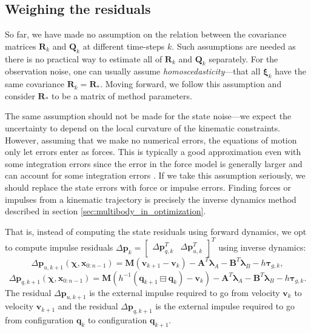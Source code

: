 \documentclass[preprint,12pt]{elsarticle}
\let\vec\bm
\let\mat\mathbf
\def\param{\vec{\chi}}
\let\amssymbboxminus\boxminus
\renewcommand{\boxminus}{\mathbin{\mathop\amssymbboxminus}}
\numberwithin{equation}{section}
\def\conf{q}
\def\obsnoise{\xi}
\begin{document}
\subsection{Weighing the residuals}
So far, we have made no assumption on the relation between the covariance matrices $\mat{R}_k$ and $\mat{Q}_k$ at different time-steps $k$.
Such assumptions are needed as there is no practical way to estimate all of $\mat{R}_k$ and $\mat{Q}_k$ separately.
For the observation noise, one can usually assume \emph{homoscedasticity}---that all $\vec{\obsnoise}_k$ have the same covariance $\mat{R}_k = \mat{R}_*$.
Moving forward, we follow this assumption and consider $\mat{R}_*$ to be a matrix of method parameters.

The same assumption should not be made for the state noise---we expect the uncertainty to depend on the local curvature of the kinematic constraints.
However, assuming that we make no numerical errors, the equations of motion only let errors enter as forces.
This is typically a good approximation even with some integration errors since the error in the force model is generally larger and can account for some integration errors \cite{sanjurjoAccuracyEfficiencyComparison2017}.
If we take this assumption seriously, we should replace the state errors with force or impulse errors.
Finding forces or impulses from a kinematic trajectory is precisely the inverse dynamics method described in section \ref{sec:multibody_in_optimization}.

That is, instead of computing the state residuals using forward dynamics, we opt to compute impulse residuals $\Delta \vec{p}_{k} = \begin{bmatrix}
    \Delta \vec{p}_{q,k}^T & \Delta \vec{p}_{u,k}^T
\end{bmatrix}^T$
using inverse dynamics:
\begin{equation}
    \Delta \vec{p}_{u, k+1}(\param, \vec{x}_{0:n-1}) = \mat{M} (\vec{v}_{k+1} - \vec{v}_k) - \mat{A}^T \vec{\lambda}_A - \mat{B}^T \vec{\lambda}_B - h \vec{\tau}_{g,k},
\end{equation}
\begin{equation}
    \Delta \vec{p}_{q, k+1}(\param, \vec{x}_{0:n-1}) = 
    \mat{M} (h^{-1}
    (\vec{\conf}_{k+1} \boxminus \vec{\conf}_{k}) 
    - \vec{v}_k) 
    - \mat{A}^T \vec{\lambda}_A -\mat{B}^T \vec{\lambda}_B - h \vec{\tau}_{g,k}.
\end{equation}
The residual $\Delta \vec{p}_{u, k+1}$ is the external impulse required to go from velocity $\vec{v}_k$ to velocity $\vec{v}_{k+1}$ and the residual $\Delta \vec{p}_{q, k+1}$ is the external impulse required to go from configuration $\vec{\conf}_k$ to configuration $\vec{\conf}_{k+1}$.
\end{document}
